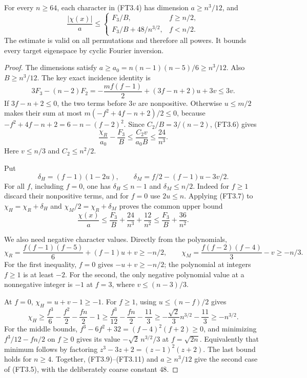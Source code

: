 \begin{lemma}[HD-FT11]
For every \(n\ge64\), each character in (FT3.4) has dimension
\(a\ge n^3/12\), and
\[
 \frac{|\chi(x)|}{a}\le
 \begin{cases}
 F_3/B,& f\ge n/2,\\
 F_3/B+48/n^{3/2},&f<n/2.
 \end{cases}
 \tag{FT3.5}
\]
The estimate is valid on all permutations and therefore all powers.
It bounds every target eigenspace by cyclic Fourier inversion.
\end{lemma}

\begin{proof}
The dimensions satisfy \(a\ge a_0=n(n-1)(n-5)/6\ge n^3/12\).
Also \(B\ge n^3/12\).
The key exact incidence identity is
\[
 3F_3-(n-2)F_2
  =-\frac{m f(f-1)}2+(3f-n+2)u+3v\le3v.
 \tag{FT3.6}
\]
If \(3f-n+2\le0\), the two terms before \(3v\) are nonpositive.
Otherwise \(u\le m/2\) makes their sum at most
\(m(-f^2+4f-n+2)/2\le0\), because
\(-f^2+4f-n+2=6-n-(f-2)^2\).
Since \(C_2/B=3/(n-2)\), (FT3.6) gives
\[
 \frac{\chi_R}{a_0}-\frac{F_3}{B}
 \le\frac{C_2v}{a_0B}\le\frac{24}{n^3}.
 \tag{FT3.7}
\]
Here \(v\le n/3\) and \(C_2\le n^2/2\).

Put
\[
 \delta_H=(f-1)(1-2u),\qquad
 \delta_M=f/2-(f-1)u-3v/2.
 \tag{FT3.8}
\]
For all \(f\), including \(f=0\), one has
\(\delta_H\le n-1\) and \(\delta_M\le n/2\).
Indeed for \(f\ge1\) discard their nonpositive terms, and for
\(f=0\) use \(2u\le n\).
Applying (FT3.7) to \(\chi_H=\chi_R+\delta_H\) and
\(\chi_M/2=\chi_R+\delta_M\) proves the common upper bound
\[
 \frac{\chi(x)}a\le\frac{F_3}{B}
                      +\frac{24}{n^3}+\frac{12}{n^2}
                  \le\frac{F_3}{B}+\frac{36}{n^2}.
 \tag{FT3.9}
\]

We also need negative character values.  Directly from the polynomials,
\[
 \chi_R=\frac{f(f-1)(f-5)}6+(f-1)u+v\ge-n/2,\qquad
 \chi_M=\frac{f(f-2)(f-4)}3-v\ge-n/3.
 \tag{FT3.10}
\]
For the first inequality, \(f=0\) gives \(-u+v\ge-n/2\);
the polynomial at integers \(f\ge1\) is at least \(-2\).
For the second, the only negative polynomial value at a nonnegative
integer is \(-1\) at \(f=3\), where \(v\le(n-3)/3\).

At \(f=0\), \(\chi_H=u+v-1\ge-1\).  For \(f\ge1\),
using \(u\le(n-f)/2\) gives
\[
 \chi_H\ge \frac{f^3}{6}-\frac{f^2}{2}-\frac{fn}{2}-1
       \ge\frac{f^3}{12}-\frac{fn}{2}-\frac{11}{3}
       \ge-\frac{\sqrt2}{3}n^{3/2}-\frac{11}{3}
       \ge-n^{3/2}.
 \tag{FT3.11}
\]
For the middle bounds,
\(f^3-6f^2+32=(f-4)^2(f+2)\ge0\), and minimizing
\(f^3/12-fn/2\) on \(f\ge0\) gives its value
\(-\sqrt2\,n^{3/2}/3\) at \(f=\sqrt{2n}\).
Equivalently that minimum follows by factoring
\(z^3-3z+2=(z-1)^2(z+2)\).
The last bound holds for \(n\ge4\).
Together, (FT3.9)--(FT3.11) and \(a\ge n^3/12\) give
the second case of (FT3.5), with the deliberately coarse constant \(48\).


\end{proof}
